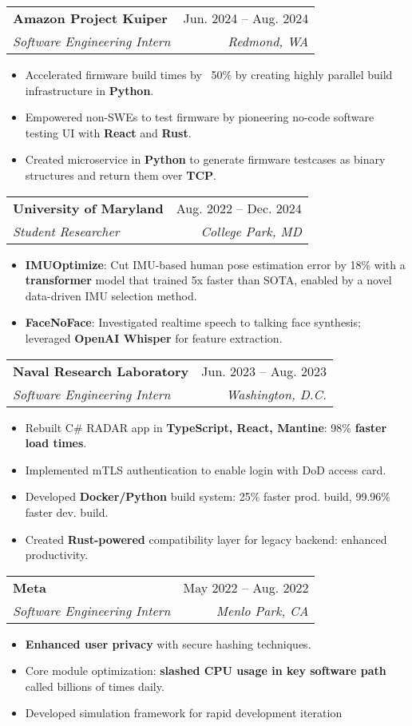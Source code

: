 \documentclass[letterpaper,11pt]{article}
\makeatletter
\newcommand{\resumeItem}[1]{
  \item\small{
    {#1 \vspace{-2pt}}
  }
}
\newcommand{\resumeSubheading}[4]{
  \vspace{-2pt}\item
    \begin{tabular*}{0.97\textwidth}[t]{l@{\extracolsep{\fill}}r}
      \textbf{#1} & #2 \\
      \textit{\small#3} & \textit{\small #4} \\
    \end{tabular*}\vspace{-7pt}
}
\newcommand{\resumeItemListStart}{\begin{itemize}}
\newcommand{\resumeItemListEnd}{\end{itemize}\vspace{-5pt}}
\makeatother
\begin{document}
    \resumeSubheading
      {Amazon Project Kuiper}{Jun. 2024 -- Aug. 2024}
      {Software Engineering Intern}{Redmond, WA}
      \resumeItemListStart
        \resumeItem{Accelerated firmware build times by ~50\% by creating highly parallel build infrastructure in \textbf{Python}.}
        \resumeItem{Empowered non-SWEs to test firmware by pioneering no-code software testing UI with \textbf{React} and \textbf{Rust}.}
        \resumeItem{Created microservice in \textbf{Python} to generate firmware testcases as binary structures and return them over \textbf{TCP}.}
      \resumeItemListEnd

    \resumeSubheading
      {University of Maryland}{Aug. 2022 -- Dec. 2024}
      {Student Researcher}{College Park, MD}
      \resumeItemListStart
        \resumeItem{\textbf{IMUOptimize}: Cut IMU-based human pose estimation error by 18\% with a \textbf{transformer} model that trained 5x faster than SOTA, enabled by a novel data-driven IMU selection method.}
        \resumeItem{\textbf{FaceNoFace}: Investigated realtime speech to talking face synthesis; leveraged \textbf{OpenAI Whisper} for feature extraction.}
      \resumeItemListEnd

    \resumeSubheading
      {Naval Research Laboratory}{Jun. 2023 -- Aug. 2023}
      {Software Engineering Intern}{Washington, D.C.}
      \resumeItemListStart
        \resumeItem{Rebuilt C\# RADAR app in \textbf{TypeScript, React, Mantine}: 98\% \textbf{faster load times}.}
        \resumeItem{Implemented mTLS authentication to enable login with DoD access card.}
        \resumeItem{Developed \textbf{Docker/Python} build system: 25\% faster prod. build, 99.96\% faster dev. build.}
        \resumeItem{Created \textbf{Rust-powered} compatibility layer for legacy backend: enhanced productivity.}
      \resumeItemListEnd

    \resumeSubheading
      {Meta}{May 2022 -- Aug. 2022}
      {Software Engineering Intern}{Menlo Park, CA}
      \resumeItemListStart
        \resumeItem{\textbf{Enhanced user privacy} with secure hashing techniques.}
        \resumeItem{Core module optimization: \textbf{slashed CPU usage in key software path} called billions of times daily.}
        \resumeItem{Developed simulation framework for rapid development iteration}
      \resumeItemListEnd
\end{document}
